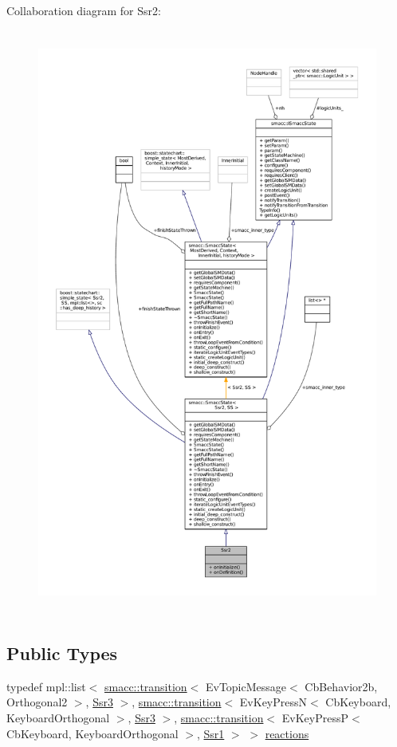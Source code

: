 Collaboration diagram for Ssr2\+:
\nopagebreak
\begin{figure}[H]
\begin{center}
\leavevmode
\includegraphics[height=550pt]{structSsr2__coll__graph}
\end{center}
\end{figure}
\subsection*{Public Types}
\begin{DoxyCompactItemize}
\item 
typedef mpl\+::list$<$ \hyperlink{classsmacc_1_1transition}{smacc\+::transition}$<$ Ev\+Topic\+Message$<$ Cb\+Behavior2b, Orthogonal2 $>$, \hyperlink{structSsr3}{Ssr3} $>$, \hyperlink{classsmacc_1_1transition}{smacc\+::transition}$<$ Ev\+Key\+PressN$<$ Cb\+Keyboard, Keyboard\+Orthogonal $>$, \hyperlink{structSsr3}{Ssr3} $>$, \hyperlink{classsmacc_1_1transition}{smacc\+::transition}$<$ Ev\+Key\+PressP$<$ Cb\+Keyboard, Keyboard\+Orthogonal $>$, \hyperlink{structSsr1}{Ssr1} $>$ $>$ \hyperlink{structSsr2_ae5ede00900d85079cb8c764b3f0fa53e}{reactions}
\end{DoxyCompactItemize}
